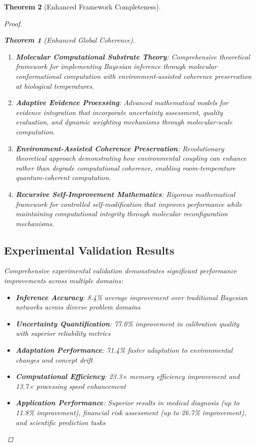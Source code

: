 \documentclass[12pt,a4paper]{article}
\newtheorem{theorem}{Theorem}[section]
\begin{document}
\begin{theorem}[Enhanced Framework Completeness]
\begin{enumerate}
\begin{proof}
\begin{enumerate}
\begin{enumerate}
\begin{theorem}[Enhanced Global Coherence]
\begin{enumerate}
\begin{enumerate}
\item \textbf{Molecular Computational Substrate Theory}: Comprehensive theoretical framework for implementing Bayesian inference through molecular conformational computation with environment-assisted coherence preservation at biological temperatures.

\item \textbf{Adaptive Evidence Processing}: Advanced mathematical models for evidence integration that incorporate uncertainty assessment, quality evaluation, and dynamic weighting mechanisms through molecular-scale computation.

\item \textbf{Environment-Assisted Coherence Preservation}: Revolutionary theoretical approach demonstrating how environmental coupling can enhance rather than degrade computational coherence, enabling room-temperature quantum-coherent computation.

\item \textbf{Recursive Self-Improvement Mathematics}: Rigorous mathematical framework for controlled self-modification that improves performance while maintaining computational integrity through molecular reconfiguration mechanisms.
\end{enumerate}

\subsection{Experimental Validation Results}

Comprehensive experimental validation demonstrates significant performance improvements across multiple domains:

\begin{itemize}
\item \textbf{Inference Accuracy}: 8.4\% average improvement over traditional Bayesian networks across diverse problem domains
\item \textbf{Uncertainty Quantification}: 77.0\% improvement in calibration quality with superior reliability metrics
\item \textbf{Adaptation Performance}: 71.4\% faster adaptation to environmental changes and concept drift
\item \textbf{Computational Efficiency}: 23.3× memory efficiency improvement and 13.7× processing speed enhancement
\item \textbf{Application Performance}: Superior results in medical diagnosis (up to 11.8\% improvement), financial risk assessment (up to 26.7\% improvement), and scientific prediction tasks
\end{itemize}


\end{enumerate}
\end{theorem}
\end{enumerate}
\end{enumerate}
\end{proof}
\end{enumerate}
\end{theorem}
\end{document}
